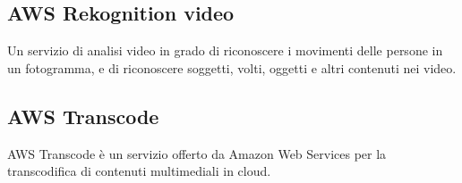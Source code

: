 \subsection*{AWS Rekognition video}
Un servizio di analisi video in grado di riconoscere i movimenti delle persone in un fotogramma, e di riconoscere soggetti, volti, oggetti e altri contenuti nei video.

\subsection*{AWS Transcode}
AWS Transcode è un servizio offerto da Amazon Web Services per la transcodifica di contenuti multimediali in cloud.


